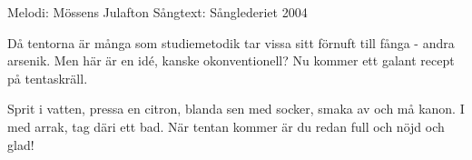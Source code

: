 \begin{song}

\begin{songmeta}
Melodi: Mössens Julafton
Sångtext: Sånglederiet 2004
\end{songmeta}

\begin{songtext}
Då tentorna är många som studiemetodik
tar vissa sitt förnuft till fånga - andra arsenik.
Men här är en idé, kanske okonventionell?
Nu kommer ett galant recept på tentaskräll.

Sprit i vatten, pressa en citron,
blanda sen med socker, smaka av och må kanon.
I med arrak, tag däri ett bad.
När tentan kommer är du redan full och nöjd och glad!

\end{songtext}
\end{song}
